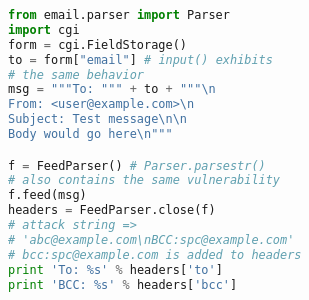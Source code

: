 \begin{lstlisting}[language=Python,caption={Python program with e-mail
      header injection vulnerability.},label={code:pyemi}, float]
from email.parser import Parser
import cgi
form = cgi.FieldStorage()
to = form["email"] # input() exhibits 
# the same behavior
msg = """To: """ + to + """\n
From: <user@example.com>\n
Subject: Test message\n\n
Body would go here\n"""

f = FeedParser() # Parser.parsestr() 
# also contains the same vulnerability
f.feed(msg)
headers = FeedParser.close(f)
# attack string => 
# 'abc@example.com\nBCC:spc@example.com'
# bcc:spc@example.com is added to headers
print 'To: %s' % headers['to']
print 'BCC: %s' % headers['bcc']
\end{lstlisting}
